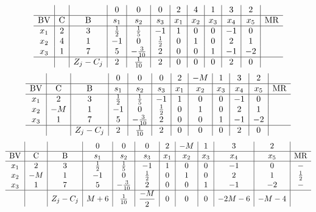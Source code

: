 \documentclass{article}
\begin{document}
\begin{align*}
\begin{array}{c|c|c|c|c|c|c|c|c|c|c|c}
 &  &  & 0 & 0 & 0 & 2 & 4 & 1 & 3 & 2 & \\
\hline
\text{BV} & \text{C} & \text{B} & s_{1} & s_{2} & s_{3} & x_{1} & x_{2} & x_{3} & x_{4} & x_{5} & \text{MR} \\
\hline
x_{1} & 2 & 3 & \frac{1}{2} & \frac{1}{5} & -1 & 1 & 0 & 0 & -1 & 0 \\
x_{2} & 4 & 1 & -1 & 0 & \frac{1}{2} & 0 & 1 & 0 & 2 & 1 \\
x_{3} & 1 & 7 & 5 & -\frac{3}{10} & 2 & 0 & 0 & 1 & -1 & -2 \\
\hline
 &  & Z_j-C_j & 2 & \frac{1}{10} & 2 & 0 & 0 & 0 & 2 & 0 & \\
\end{array}
\end{align*}
\begin{align*}
\begin{array}{c|c|c|c|c|c|c|c|c|c|c|c}
 &  &  & 0 & 0 & 0 & 2 & -M & 1 & 3 & 2 & \\
\hline
\text{BV} & \text{C} & \text{B} & s_{1} & s_{2} & s_{3} & x_{1} & x_{2} & x_{3} & x_{4} & x_{5} & \text{MR} \\
\hline
x_{1} & 2 & 3 & \frac{1}{2} & \frac{1}{5} & -1 & 1 & 0 & 0 & -1 & 0 \\
x_{2} & -M & 1 & -1 & 0 & \frac{1}{2} & 0 & 1 & 0 & 2 & 1 \\
x_{3} & 1 & 7 & 5 & -\frac{3}{10} & 2 & 0 & 0 & 1 & -1 & -2 \\
\hline
 &  & Z_j-C_j & 2 & \frac{1}{10} & 2 & 0 & 0 & 0 & 2 & 0 & \\
\end{array}
\end{align*}
\begin{align*}
\begin{array}{c|c|c|c|c|c|c|c|c|c|c|c}
 &  &  & 0 & 0 & 0 & 2 & -M & 1 & 3 & 2 & \\
\hline
\text{BV} & \text{C} & \text{B} & s_{1} & s_{2} & s_{3} & x_{1} & x_{2} & x_{3} & x_{4} & x_{5} & \text{MR} \\
\hline
x_{1} & 2 & 3 & \frac{1}{2} & \frac{1}{5} & -1 & 1 & 0 & 0 & -1 & 0 & - \\
x_{2} & -M & 1 & -1 & 0 & \frac{1}{2} & 0 & 1 & 0 & 2 & 1 & \frac{1}{2} \\
x_{3} & 1 & 7 & 5 & -\frac{3}{10} & 2 & 0 & 0 & 1 & -1 & -2 & - \\
\hline
 &  & Z_j-C_j & M + 6 & \frac{1}{10} & \dfrac{-M}{2} & 0 & 0 & 0 & -2M - 6 & -M - 4 & \\
\end{array}
\end{align*}
\end{document}
